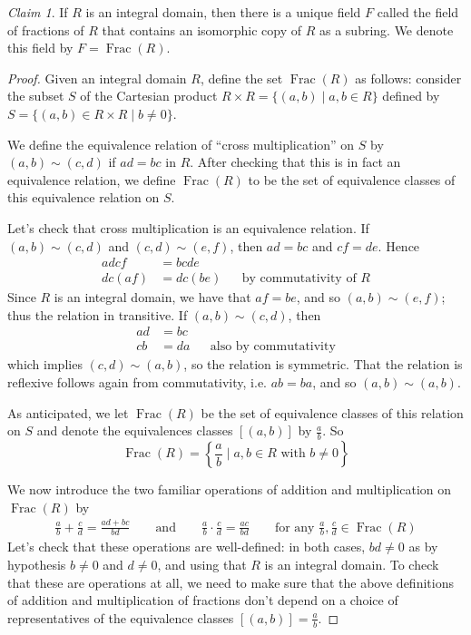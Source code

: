 \documentclass[12pt,letterpaper,DIV=11,final]{scrartcl}
\theoremstyle{plain}
\theoremstyle{definition}
\theoremstyle{remark}
\newtheorem{claim}{Claim}
\DeclareMathOperator{\Frac}{Frac}
\begin{document}
\begin{claim}
  If $R$ is an integral domain, then there is a unique field $F$ called the field of fractions of $R$ that contains an isomorphic copy of $R$ as a subring.
  We denote this field by $F = \Frac(R)$.

  \begin{proof}
    Given an integral domain $R$, define the set $\Frac(R)$ as follows:
    consider the subset $S$ of the Cartesian product $R \times R = \{ (a, b) \mid a, b \in R \}$ defined by $S = \{ (a, b) \in R \times R \mid b \neq 0 \}$.

    We define the equivalence relation of \enquote{cross multiplication} on $S$ by $(a, b) \sim (c, d)$ if $ad = bc$ in $R$.
    After checking that this is in fact an equivalence relation, we define $\Frac(R)$ to be the set of equivalence classes of this equivalence relation on $S$.

    Let's check that cross multiplication is an equivalence relation.
    If $(a, b) \sim (c, d)$ and $(c, d) \sim (e, f)$, then $ad = bc$ and $cf = de$.
    Hence
    \begin{align*}
      adcf &= bcde \\
      dc(af) &= dc(be) && \text{by commutativity of $R$}
    \end{align*}
    Since $R$ is an integral domain, we have that $af = be$, and so $(a, b) \sim (e, f)$; thus the relation in transitive.
    If $(a, b) \sim (c, d)$, then
    \begin{align*}
      ad &= bc \\
      cb &= da && \text{also by commutativity}
    \end{align*}
    which implies $(c, d) \sim (a, b)$, so the relation is symmetric.
    That the relation is reflexive follows again from commutativity, i.e. $ab = ba$, and so $(a, b) \sim (a, b)$.

    As anticipated, we let $\Frac(R)$ be the set of equivalence classes of this relation on $S$ and denote the equivalences classes $[(a, b)]$ by $\frac{a}{b}$.
    So
    \begin{displaymath}
      \Frac(R) = \left\{ \frac{a}{b} \mid a, b \in R \text{ with } b \neq 0 \right\}
    \end{displaymath}

    We now introduce the two familiar operations of addition and multiplication on $\Frac(R)$ by
    \begin{align*}
      \frac{a}{b} + \frac{c}{d} = \frac{ad + bc}{bd} \qquad \text{and} \qquad \frac{a}{b} \cdot \frac{c}{d} = \frac{ac}{bd} \qquad \text{for any $\frac{a}{b}, \frac{c}{d} \in \Frac(R)$}
    \end{align*}
    Let's check that these operations are well-defined:
    in both cases, $bd \neq 0$ as by hypothesis $b \neq 0$ and $d \neq 0$, and using that $R$ is an integral domain.
    To check that these are operations at all, we need to make sure that the above definitions of addition and multiplication of fractions don't depend on a choice of representatives of the equivalence classes $[(a, b)] = \frac{a}{b}$.


\end{proof}
\end{claim}
\end{document}
